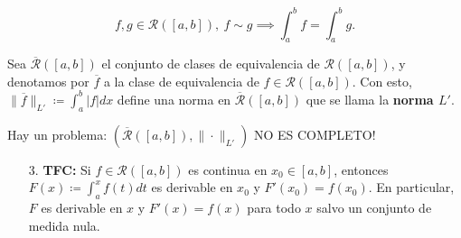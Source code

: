 \[
f,g \in \mathcal{R} ([a,b]),\ f \sim g \implies \int_{a}^{b} f = \int_{a}^{b} g.
\]

Sea $\overline{\mathcal{R}}([a,b])$ el conjunto de clases de equivalencia de $\mathcal{R}([a,b])$, y denotamos por $\overline{f}$ a la clase de equivalencia de $f \in \mathcal{R}([a,b])$. Con esto, $\| \overline{f} \|_{L'} \coloneq \int_{a}^{b} |f| dx$ define una norma en $\overline{\mathcal{R}} ([a,b])$ que se llama la \textbf{norma $L'$}.

\begin{remark}
	Hay un problema: $(\overline{\mathcal{R}} ([a,b]), \| \cdot \|_{L'})$ NO ES COMPLETO!
\end{remark}

\begin{enumerate}
	\item[3.] \textbf{TFC:} Si $f \in \mathcal{R} ([a,b])$ es continua en $x_0 \in [a,b]$, entonces $F(x) \coloneq \int_{a}^{x} f(t) dt$ es derivable en $x_0$ y $F'(x_0) = f(x_0)$. En particular, $F$ es derivable en $x$ y $F'(x)=f(x)$ para todo $x$ salvo un conjunto de medida nula.
\end{enumerate}
